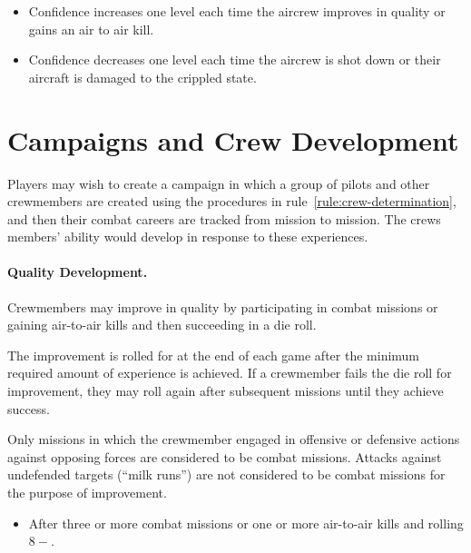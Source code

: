 \begin{advancedrules}
{\begin{itemize}
    \item Confidence increases one level each time the aircrew improves in quality or gains an air to air kill.

    \item Confidence decreases one level each time the aircrew is shot down or their aircraft is damaged to the crippled state. 

\end{itemize}


}{

\section{Campaigns and Crew Development}

Players may wish to create a campaign in which a group of pilots and other crewmembers are created using the procedures in rule~\ref{rule:crew-determination}, and then their combat careers are tracked from mission to mission. The crews members’ ability would develop in response to these experiences.

\paragraph{Quality Development.} 

Crewmembers may improve in quality by participating in combat missions or gaining air-to-air kills and then succeeding in a die roll. 

The improvement is rolled for at the end of each game after the minimum required amount of experience is achieved. If a crewmember fails the die roll for improvement, they may roll again after subsequent missions until they achieve success.

Only missions in which the crewmember engaged in offensive or defensive actions against opposing forces are considered to be combat missions. Attacks against undefended targets (“milk runs”) are not considered to be combat missions for the purpose of improvement.

\begin{itemize}

    \item {} After three or more combat missions or one or more air-to-air kills and rolling $8-$.


\end{itemize}}
\end{advancedrules}
